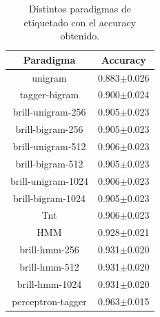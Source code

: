 \documentclass[11pt,a4paper]{report}
\begin{document}
		\begin{table}[thb!]
		\begin{center} 		
			\begin{tabular}{cc} 
				\hline	
				\textbf{Paradigma}&\textbf{Accuracy}\\
				\hline
                unigram&0.883$\pm$0.026\\
                tagger-bigram&0.900$\pm$0.024\\
                brill-unigram-256&0.905$\pm$0.023\\
                brill-bigram-256&0.905$\pm$0.023\\
                brill-unigram-512&0.906$\pm$0.023\\
                brill-bigram-512&0.905$\pm$0.023\\
                brill-unigram-1024&0.906$\pm$0.023\\
                brill-bigram-1024&0.905$\pm$0.023\\
                Tnt&0.906$\pm$0.023\\
                HMM&0.928$\pm$0.021\\
                brill-hmm-256&0.931$\pm$0.020\\
                brill-hmm-512&0.931$\pm$0.020\\
                brill-hmm-1024&0.931$\pm$0.020\\
                perceptron-tagger&0.963$\pm$0.015\\
				\hline
			\end{tabular}
			\caption{Distintos paradigmas de etiquetado con el accuracy obtenido.}	
			\label{table-task4}
		\end{center}
	\end{table}		 
	
\end{document}
